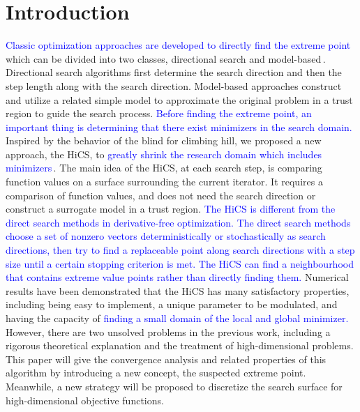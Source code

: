 \documentclass[mathpazo]{csam}
\theoremstyle{remark}
\begin{document}
	\maketitle
	
\section{Introduction}
\label{sec:intro}

\textcolor{blue}{
Classic optimization approaches are developed to directly find the extreme point}
which can be divided into two
classes, directional search and model-based\,\cite{sun2006optimization,
nocedal2006numerical, conn2009introduction}.  Directional search algorithms first
determine the search direction and then the step length along with the search
direction. Model-based approaches construct and utilize a related simple model to
approximate the original problem in a trust region to guide the search process. 
\textcolor{blue}{
Before finding the extreme point, an important thing is 
determining that there exist minimizers in the search domain.
}
Inspired by the behavior of the blind for climbing hill, we
proposed a new approach, the HiCS, to \textcolor{blue}{greatly shrink the research
domain which includes minimizers}\,\cite{huang2017hill}.
The main idea of the HiCS, at each search step, is comparing
function values on a surface surrounding the current iterator.
It requires a comparison of function values, and does not need the search direction
or construct a surrogate model in a trust region.
\textcolor{blue}{
The HiCS is different from the direct search methods in
derivative-free optimization. The direct search methods choose a set of nonzero
vectors deterministically or stochastically as search directions, then try to find a
replaceable point along search directions with a step size until a certain stopping
criterion is met.  
The HiCS can find a neighbourhood that contains extreme value points
rather than directly finding them. 
}
Numerical results have been demonstrated that the HiCS has many 
satisfactory properties, including being easy to implement,
a unique parameter to be modulated, and having the capacity
of \textcolor{blue}{finding a small domain of the local and global minimizer. }
However, there are two unsolved problems in the
previous work, including a rigorous theoretical explanation and
the treatment of high-dimensional problems.
This paper will give the convergence analysis and related
properties of this algorithm by introducing a new concept, the suspected extreme
point.
Meanwhile, a new strategy will be proposed to discretize the search
surface for high-dimensional objective functions.
\end{document}
